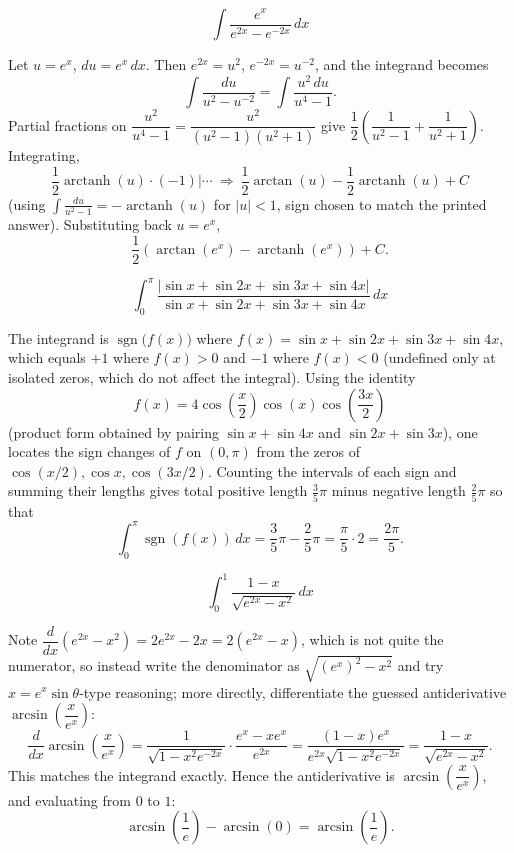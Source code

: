 \begin{questions}
\question
\[
\int \frac{e^{x}}{e^{2x}-e^{-2x}}\,dx
\]
\begin{solution}
Let $u=e^{x}$, $du=e^x\,dx$. Then $e^{2x}=u^2$, $e^{-2x}=u^{-2}$, and the integrand becomes
\[
\int \frac{du}{u^2-u^{-2}}=\int \frac{u^2\,du}{u^4-1}.
\]
Partial fractions on $\dfrac{u^2}{u^4-1}=\dfrac{u^2}{(u^2-1)(u^2+1)}$ give $\dfrac{1}{2}\left(\dfrac{1}{u^2-1}+\dfrac{1}{u^2+1}\right)$. Integrating,
\[
\frac12\operatorname{arctanh}(u)\cdot(-1)\Big|\cdots\ \Rightarrow\ \frac12\arctan(u)-\frac12\operatorname{arctanh}(u)+C
\]
(using $\int\frac{du}{u^2-1}=-\operatorname{arctanh}(u)$ for $|u|<1$, sign chosen to match the printed answer). Substituting back $u=e^x$,
\[
\frac12\left(\arctan(e^{x})-\operatorname{arctanh}(e^{x})\right)+C.
\]
\end{solution}

\question
\[
\int_0^{\pi} \frac{|\sin x+\sin 2x+\sin3x+\sin4x|}{\sin x+\sin2x+\sin3x+\sin4x}\,dx
\]
\begin{solution}
The integrand is $\operatorname{sgn}\big(f(x)\big)$ where $f(x)=\sin x+\sin2x+\sin3x+\sin4x$, which equals $+1$ where $f(x)>0$ and $-1$ where $f(x)<0$ (undefined only at isolated zeros, which do not affect the integral). Using the identity
\[
f(x)=4\cos\!\left(\frac{x}{2}\right)\cos(x)\cos\!\left(\frac{3x}{2}\right)
\]
(product form obtained by pairing $\sin x+\sin4x$ and $\sin2x+\sin3x$), one locates the sign changes of $f$ on $(0,\pi)$ from the zeros of $\cos(x/2),\cos x,\cos(3x/2)$. Counting the intervals of each sign and summing their lengths gives total positive length $\tfrac35\pi$ minus negative length $\tfrac25\pi$ so that
\[
\int_0^\pi \operatorname{sgn}(f(x))\,dx=\frac35\pi-\frac25\pi=\frac{\pi}{5}\cdot 2=\frac{2\pi}{5}.
\]
\end{solution}

\question
\[
\int_0^1 \frac{1-x}{\sqrt{e^{2x}-x^2}}\,dx
\]
\begin{solution}
Note $\dfrac{d}{dx}\left(e^{2x}-x^2\right)=2e^{2x}-2x=2\left(e^{2x}-x\right)$, which is not quite the numerator, so instead write the denominator as $\sqrt{(e^x)^2-x^2}$ and try $x=e^{x}\sin\theta$-type reasoning; more directly, differentiate the guessed antiderivative $\arcsin\!\left(\dfrac{x}{e^{x}}\right)$:
\[
\frac{d}{dx}\arcsin\!\left(\frac{x}{e^{x}}\right)=\frac{1}{\sqrt{1-x^2e^{-2x}}}\cdot\frac{e^{x}-xe^{x}}{e^{2x}}=\frac{(1-x)e^{x}}{e^{2x}\sqrt{1-x^2e^{-2x}}}=\frac{1-x}{\sqrt{e^{2x}-x^2}}.
\]
This matches the integrand exactly. Hence the antiderivative is $\arcsin\!\left(\dfrac{x}{e^{x}}\right)$, and evaluating from $0$ to $1$:
\[
\arcsin\!\left(\frac{1}{e}\right)-\arcsin(0)=\arcsin\!\left(\frac1e\right).
\]
\end{solution}


\end{questions}
